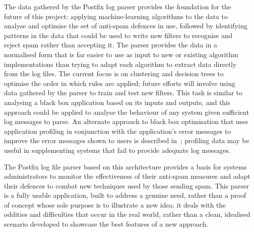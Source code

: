 The data gathered by the Postfix log parser provides the foundation for the
future of this project: applying machine-learning algorithms to the data to
analyse and optimise the set of anti-spam defences in use, followed by
identifying patterns in the data that could be used to write new filters to
recognise and reject spam rather than accepting it.  The parser provides
the data in a normalised form that is far easier to use as input to new or
existing algorithm implementations than trying to adapt each algorithm to
extract data directly from the log files.  The current focus is on
clustering and decision trees to optimise the order in which rules are
applied; future efforts will involve using data gathered by the parser to
train and test new filters.  This task is similar to analysing a black
box application based on its inputs and outputs, and this approach could be
applied to analyse the behaviour of any system given sufficient log
messages to parse.  An alternate approach to black box optimisation that
uses application profiling in conjunction with the application's error
messages to improve the error messages shown to users is described
in~\cite{black-box-error-reporting}; profiling data may be useful in
supplementing systems that fail to provide adequate log messages.

The Postfix log file parser based on this architecture provides a basis for
systems administrators to monitor the effectiveness of their anti-spam
measures and adapt their defences to combat new techniques used by those
sending spam.  This parser is a fully usable application, built to address
a genuine need, rather than a proof of concept whose sole purpose is to
illustrate a new idea; it deals with the oddities and difficulties that
occur in the real world, rather than a clean, idealised scenario developed
to showcase the best features of a new approach.


